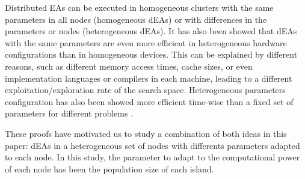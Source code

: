 \documentclass[final,1p,times]{elsarticle}
\begin{document}
Distributed EAs can be executed in homogeneous clusters with the same parameters in all nodes (homogeneous dEAs) or with differences in the parameters or nodes (heterogeneous dEAs).
It  has also been showed \cite{HETEROGENEOUSHARD} that dEAs with the same parameters are even
more efficient in heterogeneous hardware configurations than in
homogeneous devices. This can be explained by different reasons, such
as different memory access times, cache sizes, %
or even implementation
languages or compilers in each machine, leading to a different
exploitation/exploration rate of the search space. %
Heterogeneous parameters
configuration  has also been showed more  efficient time-wise than a fixed
set %
of parameters for different problems
\cite{HETEROGENEOUSPARAMETERS}.   %

These proofs have motivated us to study a combination of both ideas in this paper: dEAs in a heterogeneous set of nodes with differents parameters adapted to each node. In this study, the parameter to adapt to the computational power of each node has been the population size of each island.

\end{document}
